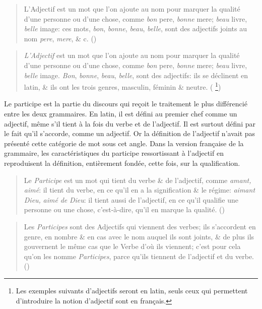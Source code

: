 \documentclass[output=paper]{langsci/langscibook}
\begin{document}
\begin{quote}
    L’Adjectif est un mot que l’on ajoute au nom pour marquer la qualité d’une personne ou d’une chose, comme \textit{bon} pere, \textit{bonne} mere; \textit{beau} livre, \textit{belle} image: ces mots, \textit{bon}, \textit{bonne}, \textit{beau}, \textit{belle}, sont des adjectifs joints au nom \textit{pere}, \textit{mere}, \& c. (\citealt[12]{lhomond_elemens_1790})
\end{quote}

\begin{quote}
    \textit{L’Adjectif} est un mot que l’on ajoute au nom pour marquer la qualité d’une personne ou d’une chose, comme \textit{bon} pere, \textit{bonne} mere; \textit{beau} livre, \textit{belle} image. \textit{Bon}, \textit{bonne}, \textit{beau}, \textit{belle}, sont des adjectifs: ils se déclinent en latin, \& ils ont les trois genres, masculin, féminin \& neutre. (\citealt[11]{lhomond_elemens_1781} \footnote{ \textrm{Les exemples suivants d’adjectifs seront en latin, seuls ceux qui permettent d’introduire la notion d’adjectif sont en français.}})
\end{quote}

Le participe est la partie du discours qui reçoit le traitement le plus différencié entre les deux grammaires. En latin, il est défini au premier chef comme un adjectif, même s’il tient à la fois du verbe et de l’adjectif. Il est surtout défini par le fait qu’il s’accorde, comme un adjectif. Or la définition de l’adjectif n’avait pas présenté cette catégorie de mot sous cet angle. Dans la version française de la grammaire, les caractéristiques du participe ressortissant à l’adjectif en reproduisent la définition, entièrement fondée, cette fois, sur la qualification.

\begin{quote}
    Le \textit{Participe} est un mot qui tient du verbe \& de l’adjectif, comme \textit{amant,} \textit{aimé}: il tient du verbe, en ce qu’il en a la signification \& le régime: \textit{aimant} \textit{Dieu,} \textit{aimé} \textit{de} \textit{Dieu}: il tient aussi de l’adjectif, en ce qu’il qualifie une personne ou une chose, c’est-à-dire, qu’il en marque la qualité. (\citealt[60]{lhomond_elemens_1790})
\end{quote}

\begin{quote}
    Les \textit{Participes} sont des Adjectifs qui viennent des verbes; ils s’accordent en genre, en nombre \& en cas avec le nom auquel ils sont joints, \& de plus ils gouvernent le même cas que le Verbe d’où ils viennent; c’est pour cela qu’on les nomme \textit{Participes}, parce qu’ils tiennent de l’adjectif et du verbe. (\citealt[90]{lhomond_elemens_1781})
\end{quote}
\end{document}
